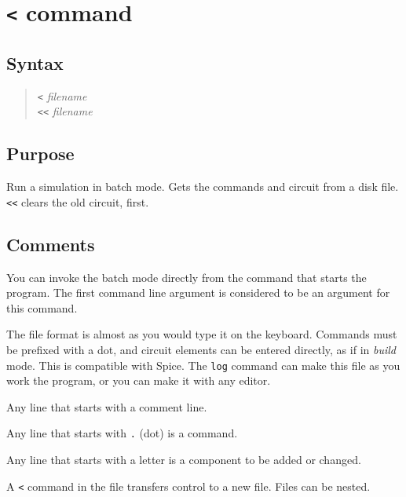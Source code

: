 \section{{\tt <} command}
\subsection{Syntax}
\begin{verse}
{\tt <} {{\it filename}}\\
{\tt <<} {{\it filename}}
\end{verse}
\subsection{Purpose}

Run a simulation in batch mode.  Gets the commands and circuit from a disk
file.  {\tt <<} clears the old circuit, first.
\subsection{Comments}

You can invoke the batch mode directly from the command that starts the
program.  The first command line argument is considered to be an argument
for this command.

The file format is almost as you would type it on the keyboard.  Commands
must be prefixed with a dot, and circuit elements can be entered directly,
as if in {\em build} mode.  This is compatible with Spice.  The {\tt log}
command can make this file as you work the program, or you can make it with
any editor.  

Any line that starts with {\tt *} a comment line.

Any line that starts with {\tt .} (dot) is a command.

Any line that starts with a letter is a component to be added or changed.

A {\tt <} command in the file transfers control to a new file.  Files can be
nested.

